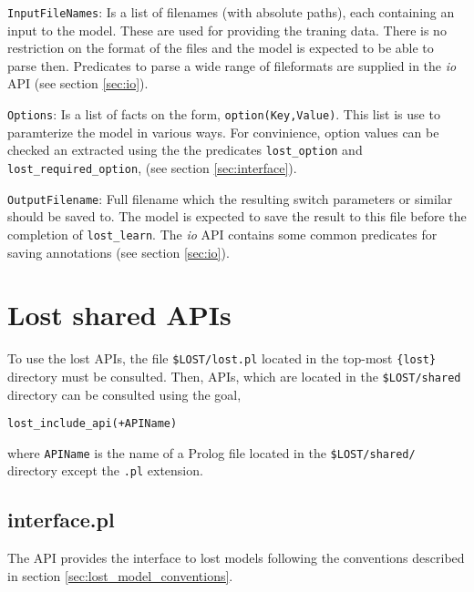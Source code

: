 \documentclass{book}
\begin{document}
\texttt{InputFileNames}: Is a list of filenames (with absolute paths),
each containing an input to the model. These are used for providing 
the traning data. There is no restriction on the format of the files 
and the model is expected to be able to parse then. Predicates to
parse a wide range of fileformats are supplied in
 the \emph{io} API (see section \ref{sec:io}). 

\texttt{Options}: Is a list of facts on the form,
\texttt{option(Key,Value)}. This list is use to paramterize the model
in various ways. For convinience, option values can be checked an
extracted using the the predicates \texttt{lost\_option} and
\texttt{lost\_required\_option}, (see section \ref{sec:interface}).

\texttt{OutputFilename}: Full filename which the resulting switch
parameters or similar should be saved to. The model is expected to save
the result to this file before the completion of 
\texttt{lost\_learn}. The \emph{io} API contains some
common predicates for saving annotations (see section \ref{sec:io}).

\chapter{Lost shared APIs}

To use the lost APIs, the file \texttt{\$LOST/lost.pl} located in the
top-most \texttt{\{lost\}} directory must be consulted. Then,
APIs, which are located in the \texttt{\$LOST/shared} directory
can be consulted using the goal, 
\begin{verbatim}
lost_include_api(+APIName)
\end{verbatim}

\noindent
where \texttt{APIName} is the name of a Prolog file located
in the \texttt{\$LOST/shared/} directory except the \texttt{.pl}
extension.

\section{interface.pl}

The API provides the interface to lost models following the
conventions described in section \ref{sec:lost_model_conventions}.
\end{document}
